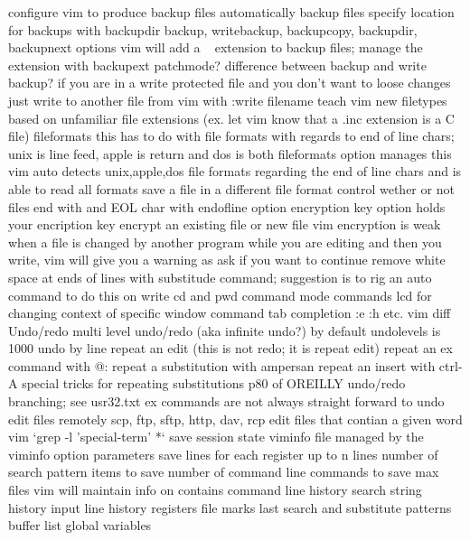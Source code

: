 \documentclass[12pt]{book}
\begin{document}
{{    configure vim to produce backup files
      automatically backup files
      specify location for backups with backupdir
      backup, writebackup, backupcopy, backupdir, backupnext options
      vim will add a ~ extension to backup files; manage the extension with backupext
      patchmode?
      difference between backup and write backup?
      if you are in a write protected file and you don't want to loose changes just write to another file from vim with :write filename
    teach vim new filetypes based on unfamiliar file extensions (ex. let vim know that a .inc extension is a C file)
    fileformats
      this has to do with file formats with regards to end of line chars; unix is line feed, apple is return and dos is both
      fileformats option manages this
      vim auto detects unix,apple,dos file formats regarding the end of line chars and is able to read all formats
      save a file in a different file format
    control wether or not files end with and EOL char with endofline option
    encryption
      key option holds your encription key
      encrypt an existing file or new file
      vim encryption is weak
    when a file is changed by another program while you are editing and then you write, vim will give you a warning as ask if you want to continue
    remove white space at ends of lines with substitude command; suggestion is to rig an auto command to do this on write
    cd and pwd command mode commands
      lcd for changing context of specific window
  command tab completion :e :h etc.
  vim diff
  Undo/redo
    multi level undo/redo (aka infinite undo?)
      by default undolevels is 1000
    undo by line
    repeat an edit (this is not redo; it is repeat edit)
    repeat an ex command with @:
    repeat a substitution with ampersan
    repeat an insert with ctrl-A
    special tricks for repeating substitutions p80 of OREILLY
    undo/redo branching; see usr32.txt
    ex commands are not always straight forward to undo
  edit files remotely
    scp, ftp, sftp, http, dav, rcp
  edit files that contian a given word
    vim `grep -l 'special-term' *`
  save session state
    viminfo file
      managed by the viminfo option parameters
        save lines for each register up to n lines
        number of search pattern items to save
        number of command line commands to save
        max files vim will maintain info on
      contains
        command line history
        search string history
        input line history
        registers
        file marks
        last search and substitute patterns
        buffer list
        global variables
}}
\end{document}
